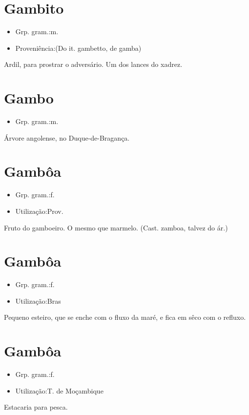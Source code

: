 \section{Gambito}
\begin{itemize}
\item {Grp. gram.:m.}
\end{itemize}
\begin{itemize}
\item {Proveniência:(Do it. \textunderscore gambetto\textunderscore , de \textunderscore gamba\textunderscore )}
\end{itemize}
Ardil, para prostrar o adversário.
Um dos lances do xadrez.
\section{Gambo}
\begin{itemize}
\item {Grp. gram.:m.}
\end{itemize}
Árvore angolense, no Duque-de-Bragança.
\section{Gambôa}
\begin{itemize}
\item {Grp. gram.:f.}
\end{itemize}
\begin{itemize}
\item {Utilização:Prov.}
\end{itemize}
Fruto do gamboeiro.
O mesmo que \textunderscore marmelo\textunderscore .
(Cast. \textunderscore zamboa\textunderscore , talvez do ár.)
\section{Gambôa}
\begin{itemize}
\item {Grp. gram.:f.}
\end{itemize}
\begin{itemize}
\item {Utilização:Bras}
\end{itemize}
Pequeno esteiro, que se enche com o fluxo da maré, e fica em sêco com o refluxo.
\section{Gambôa}
\begin{itemize}
\item {Grp. gram.:f.}
\end{itemize}
\begin{itemize}
\item {Utilização:T. de Moçambique}
\end{itemize}
Estacaria para pesca.
